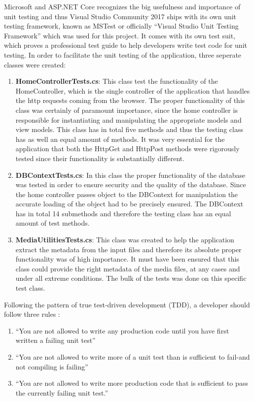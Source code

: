 Microsoft and ASP.NET Core recognizes the big usefulness and importance of unit testing and thus Visual Studio Community 2017 ships with its own unit testing framework, known as MSTest or officially ``Visual Studio Unit Testing Framework'' which was used for this project. It comes with its own test suit, which proves a professional test guide to help developers write test code for unit testing.
In order to facilitate the unit testing of the application, three seperate classes were created:
\begin{enumerate}
\item \textbf{HomeControllerTests.cs}: This class test the functionality of the HomeController, which is the single controller of the application that handles the http requests coming from the browser. The proper functionality of this class was certainly of paramount importance, since the home controller is responsible for instantiating and manipulating the appropriate models and view models.  This class has in total five methods and thus the testing class has as well an equal amount of methods. It was very essential for the application that both the HttpGet and HttpPost methods were rigorously tested since their functionality is substantially different.
\item \textbf{DBContextTests.cs}: In this class the proper functionality of the database was tested in order to ensure security and the quality of the database. Since the home controller passes object to the DBContext for manipulation the accurate loading of the object had to be precisely ensured. The DBContext has in total 14 submethods and therefore the testing class has an equal amount of test methods.
\item \textbf{MediaUtilitiesTests.cs}: This class was created to help the application extract the metadata from the input files and therefore its absolute proper functionality was of high importance. It must have been ensured that this class could provide the right metadata of the media files, at any cases and under all extreme conditions. The bulk of the tests was done on this specific test class. 
 
\end{enumerate}

Following the pattern of true test-driven development (TDD)\cite{tdd1}\cite{tdd2},  a developer should follow three rules\cite{clean_coder} :

\begin{enumerate}
\item ``You are not allowed to write any production code until you have first written a failing unit test''
\item ``You are not allowed to write more of a unit test than is sufficient to fail-and not compiling is failing''
\item ``You are not allowed to write more production code that is sufficient to pass the currently failing unit test.''

\end{enumerate}


